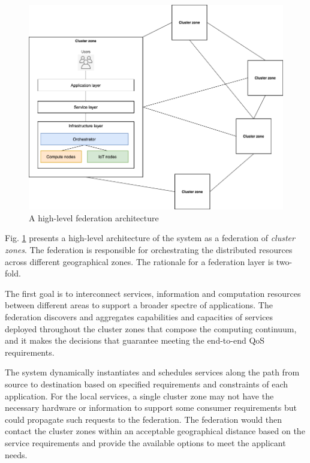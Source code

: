 \begin{figure}[ht]
\centering
\includegraphics[width=\columnwidth]{figures/architecture-federation}
\caption{A high-level federation architecture \label{fig:architecture-federation}}
\end{figure}

Fig. \ref{fig:architecture-federation} presents a high-level architecture of the system as a federation of \textit{cluster zones}. The federation is responsible for orchestrating the distributed resources across different geographical zones. The rationale for a federation layer is two-fold.

The first goal is to interconnect services, information and computation resources between different areas to support a broader spectre of applications. The federation discovers and aggregates capabilities and capacities of services deployed throughout the cluster zones that compose the computing continuum, and it makes the decisions that guarantee meeting the end-to-end QoS requirements.

The system dynamically instantiates and schedules services along the path from source to destination based on specified requirements and constraints of each application. For the local services, a single cluster zone may not have the necessary hardware or information to support some consumer requirements but could propagate such requests to the federation. The federation would then contact the cluster zones within an acceptable geographical distance based on the service requirements and provide the available options to meet the applicant needs.

